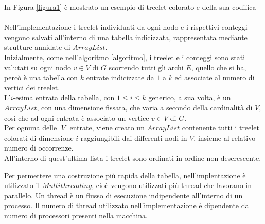  In Figura \ref{figura1} \`e mostrato un esempio di treelet colorato e della sua codifica\\\\
Nell'implementazione i treelet individuati da ogni nodo e i rispettivi conteggi vengono salvati all'interno di una tabella indicizzata, rappresentata mediante strutture annidate di $ ArrayList $.\\
Inizialmente, come nell'algoritmo \ref{algoritmo}, i treelet e i conteggi sono stati valutati su ogni nodo $ v \in V $ di $ G $ scorrendo tutti gli archi $ E $, quello che si ha, perc\`o \`e una tabella con $ k $ entrate indicizzate da $ 1 $ a $ k $ ed associate al numero di vertici dei treelet.\\ 
L'$ i $-esima entrata della tabella, con $ 1\le i \le k $ generico, a sua volta, \`e un $ ArrayList $, con una dimensione fissata, che varia a secondo della cardinalit\`a di $ V $, cos\`i che ad ogni entrata \`e associato un vertice $ v\in V $ di $ G $.\\
Per ognuna delle $ |V| $ entrate, viene creato un $ ArrayList $ contenente tutti i treelet colorati di dimensione $ i $ raggiungibili dai differenti nodi in $ V $, insieme al relativo numero di occorrenze.\\
All'interno di quest'ultima lista i treelet sono ordinati in ordine non descrescente.

Per permettere una costruzione pi\`u rapida della tabella, nell'implentazione \`e utilizzato il $ Multithreading $, cio\`e vengono utilizzati pi\`u thread che lavorano in parallelo.
Un thread \`e un flusso di esecuzione indipendente all'interno di un processo.
Il numero di thread utilizzato nell'implementazione \`e dipendente dal numero di processori presenti nella macchina.





	
